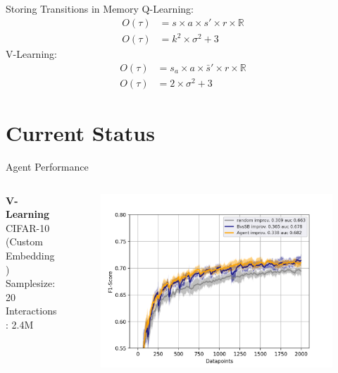 \documentclass[aspectratio=169, 11pt, invertlogo]{ismll-slides}
\begin{document}

\begin{frame}[fragile]{Storing Transitions in Memory}
	Q-Learning:
	\begin{align*}
		O(\tau) &= s \times a \times s' \times r \times \mathbb{R} \\
		O(\tau) &= k^2 \times \sigma^2 + 3
	\end{align*}
	V-Learning:
	\begin{align*}
		O(\tau) &= s_a \times a \times \bar s' \times r \times \mathbb{R} \\
		O(\tau) &= 2 \times \sigma^2 + 3
	\end{align*}
\end{frame}


\section{Current Status}

\begin{frame}[fragile]{Agent Performance}
	\begin{columns}
		\begin{column}{.3\linewidth}
			\textbf{V-Learning} \\ [1mm]
			CIFAR-10 (Custom Embedding) \\ [1mm]
			Samplesize: 20 \\ [1mm]
			Interactions: 2.4M \\ [1mm]
		\end{column}
		\begin{column}{.65\linewidth}
			\begin{figure}
				\centering
				\includegraphics[width=\linewidth]{pics/eval_CIFAR10.png}
			\end{figure}
		\end{column}
	\end{columns}
\end{frame}
\end{document}
